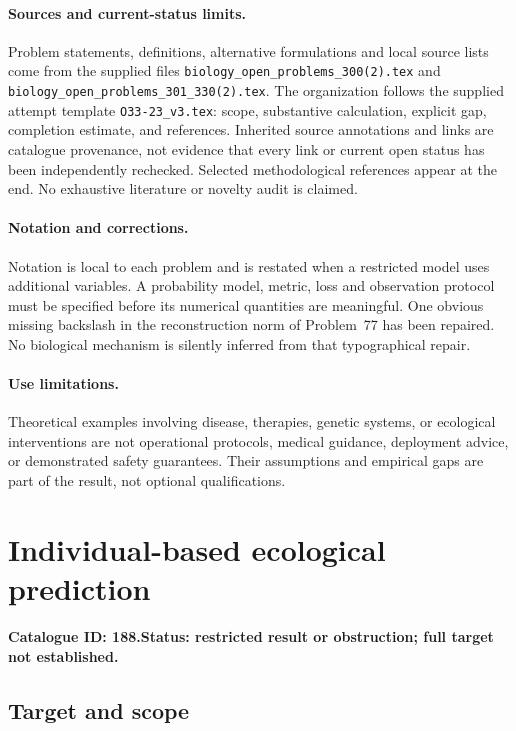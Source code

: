 \documentclass[11pt]{article}
\begin{document}
\paragraph{Sources and current-status limits.}
Problem statements, definitions, alternative formulations and local source lists
come from the supplied files
\texttt{biology\_open\_problems\_300(2).tex} and
\texttt{biology\_open\_problems\_301\_330(2).tex}.
The organization follows the supplied attempt template
\texttt{O33-23\_v3.tex}: scope, substantive calculation, explicit gap,
completion estimate, and references. Inherited source annotations and links are
catalogue provenance, not evidence that every link or current open status has
been independently rechecked. Selected methodological references appear at the
end. No exhaustive literature or novelty audit is claimed.

\paragraph{Notation and corrections.}
Notation is local to each problem and is restated when a restricted model uses
additional variables. A probability model, metric, loss and observation protocol
must be specified before its numerical quantities are meaningful. One obvious
missing backslash in the reconstruction norm of Problem~77 has been repaired.
No biological mechanism is silently inferred from that typographical repair.

\paragraph{Use limitations.}
Theoretical examples involving disease, therapies, genetic systems, or ecological
interventions are not operational protocols, medical guidance, deployment advice,
or demonstrated safety guarantees. Their assumptions and empirical gaps are part
of the result, not optional qualifications.

\setcounter{section}{187}
\section{Individual-based ecological prediction}
\label{prob:188}
\noindent\textbf{Catalogue ID: 188.}\quad \textbf{Status: restricted result or obstruction; full target not established.}
\subsection{Target and scope}
\end{document}

